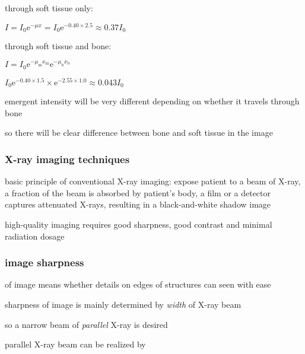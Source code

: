 \sol through soft tissue only:

{
	\centering
	
	$ I = I_0 \mathrm{e}^{-\mu x} = I_0 \mathrm{e}^{-0.40\times2.5} \approx 0.37 I_0$
	
}

through soft tissue and bone:

{
	\centering
	
	$ I = I_0 \mathrm{e}^{-\mu_\text{m} x_\text{m}} \mathrm{e}^{-\mu_\text{b} x_\text{b}}$
	
	$I_0 \mathrm{e}^{-0.40\times1.5} \times \mathrm{e}^{-2.55\times1.0}  \approx 0.043 I_0$
	
}

emergent intensity will be very different depending on whether it travels through bone

so there will be clear difference between bone and soft tissue in the image \eoe



\subsubsection{X-ray imaging techniques}

basic principle of conventional X-ray imaging: expose patient to a beam of X-ray, a fraction of the beam is absorbed by patient's body, a film or a detector captures attenuated X-rays, resulting in a black-and-white shadow image

high-quality imaging requires good sharpness, good contrast and minimal radiation dosage

\subsubsection*{image sharpness}

 of image means whether details on edges of structures can seen with ease
	
sharpness of image is mainly determined by \emph{width} of X-ray beam

so a narrow beam of \emph{parallel} X-ray is desired

\cmt parallel X-ray beam can be realized by

